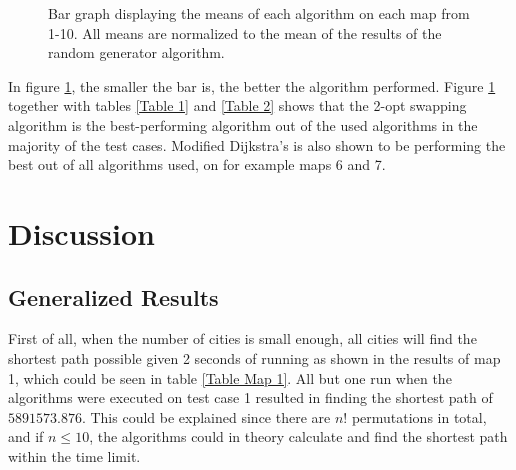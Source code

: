 \documentclass{article}
\begin{document}
\begin{figure}[H]
\caption{Bar graph displaying the means of each algorithm on each map from 1-10. All means are normalized to the mean of the results of the random generator algorithm.} \label{MeanDiagram}
\end{figure}

\noindent
In figure \ref{MeanDiagram}, the smaller the bar is, the better the algorithm performed. Figure \ref{MeanDiagram} together with tables \ref{Table 1} and \ref{Table 2} shows that the 2-opt swapping algorithm is the best-performing algorithm out of the used algorithms in the majority of the test cases. Modified Dijkstra's is also shown to be performing the best out of all algorithms used, on for example maps 6 and 7. 


\section{Discussion}\label{sec4}

\subsection{Generalized Results}\label{subsec1}
First of all, when the number of cities is small enough, all cities will find the shortest path possible given 2 seconds of running as shown in the results of map 1, which could be seen in table \ref{Table Map 1}. All but one run when the algorithms were executed on test case 1 resulted in finding the shortest path of $5891573.876$. This could be explained since there are $n!$ permutations in total, and if $n\leq 10$, the algorithms could in theory calculate and find the shortest path within the time limit.
\end{document}
